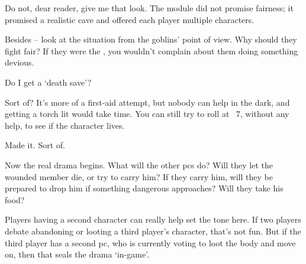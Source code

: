 \begin{multicols}{3}
\bigLine
\vspace{2em}
\noindent
Do not, dear reader, give me that look.
The module did not promise fairness; it promised a realistic cave and offered each player multiple characters.

Besides -- look at the situation from the goblins' point of view.
Why should they fight fair?
If they were the , you wouldn't complain about them doing something devious.

\bigLine

\null
\begin{description}\sf
  \item[Player 3:]
  Do I get a `death save'?
  \item[\Glsentrytext{gm}:]
  Sort of?
  It's more of a first-aid attempt, but nobody can help in the dark, and getting a torch lit would take time.
  You can still try to roll at ~7, without any help, to see if the character lives.
  \item[Player 3:]
  Made it.
  Sort of.
\end{description}

\bigLine
\vspace{2em}

\noindent
Now the real drama begins.
What will the other \glspl{pc} do?
Will they let the wounded member die, or try to carry him?
If they carry him, will they be prepared to drop him if something dangerous approaches?
Will they take his food?

Players having a second character can really help set the tone here.
If two players debate abandoning or looting a third player's character, that's not fun.
But if the third player has a second \gls{pc}, who is currently voting to loot the body and move on, then that seals the drama `in-game'.

\end{multicols}
